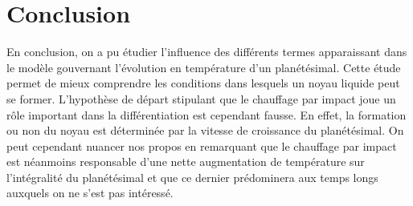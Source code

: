 \documentclass[10pt,a4paper]{article}
\numberwithin{equation}{section}
\begin{document}
\section{Conclusion}
En conclusion, on a pu étudier l'influence des différents termes apparaissant dans le modèle gouvernant l'évolution en température d'un planétésimal. Cette étude permet de mieux comprendre les conditions dans lesquels un noyau liquide peut se former. L'hypothèse de départ stipulant que le chauffage par impact joue un rôle important dans la différentiation est cependant fausse. En effet, la formation ou non du noyau est déterminée par la vitesse de croissance du planétésimal. On peut cependant nuancer nos propos en remarquant que le chauffage par impact est néanmoins responsable d'une nette augmentation de température sur l'intégralité du planétésimal et que ce dernier prédominera aux temps longs auxquels on ne s'est pas intéressé.


\newpage

 
\end{document}
